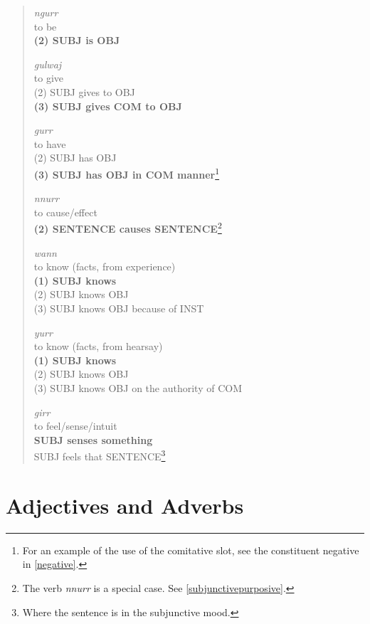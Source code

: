 \begin{quote}
\begin{multicols}{2}
\textit{ngurr}\\
to be\\
\textbf{(2) SUBJ is OBJ}

\textit{gulwaj}\\
to give\\
(2) SUBJ gives to OBJ\\
\textbf{(3) SUBJ gives COM to OBJ}
\end{multicols}

\begin{multicols}{2}
\textit{gurr}\\
to have\\
(2) SUBJ has OBJ\\
\textbf{(3) SUBJ has OBJ in COM manner}\footnote{For an example of the use of the comitative slot, see the constituent negative in \autoref{negative}.}

\textit{nnurr}\\
to cause/effect\\
\textbf{(2) SENTENCE causes SENTENCE}\footnote{The verb \textit{nnurr} is a special case. See \autoref{subjunctivepurposive}.}
\end{multicols}

\begin{multicols}{2}
\textit{wann}\\
to know (facts, from experience)\\
\textbf{(1) SUBJ knows}\\
(2) SUBJ knows OBJ\\
(3) SUBJ knows OBJ because of INST

\textit{yurr}\\
to know (facts, from hearsay)\\
\textbf{(1) SUBJ knows}\\
(2) SUBJ knows OBJ\\
(3) SUBJ knows OBJ on the authority of COM
\end{multicols}

\textit{girr}\\
to feel/sense/intuit\\
\textbf{SUBJ senses something}\\
SUBJ feels that SENTENCE\footnote{Where the sentence is in the subjunctive mood.}
\end{quote}

\section{Adjectives and Adverbs}

